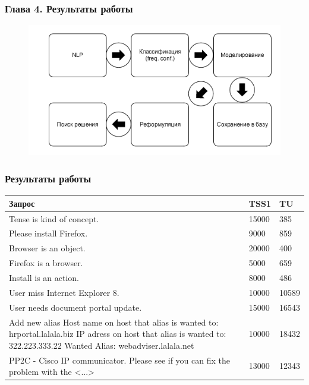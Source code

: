 \documentclass[14pt]{beamer}
\begin{document}
\begin{frame}
\frametitle{Глава 4. Результаты работы}
\begin{figure} [h] 
  \center
  \includegraphics [scale=0.6] {workflow}
  \caption{} 
  \label{img:workflow}  
\end{figure}
\end{frame}

\begin{frame}
\frametitle{Результаты работы}
\begin{table}
	
\small
\begin{tabular} {|p{8cm}|p{1cm}|p{1cm}|}

\hline
\textbf{Запрос} & TSS1 & TU \\
\hline
  Tense is kind of concept. & 15000 & 385 \\
  
  \hline
  Please install Firefox.  & 9000 & 859 \\
  \hline
  Browser is an object.   & 20000 & 400 \\
  \hline
  Firefox is a browser.   & 5000 & 659  \\
  \hline
  Install is an action.    & 8000 & 486 \\
  \hline
  User miss Internet Explorer 8.     & 10000 & 10589 \\
  \hline
  User needs document portal update.    & 15000 & 16543 \\
  \hline
  Add new alias Host name on host that alias is wanted to: hrportal.lalala.biz IP adress on host that alias is wanted to: 322.223.333.22 Wanted Alias:    webadviser.lalala.net    & 10000 & 18432  \\ 
  \hline
  PP2C - Cisco IP communicator. Please see if you can fix the problem with the <...> & 13000 & 12343 \\ 
   \hline
   \end{tabular}
\end{table}
\end{frame}
\end{document}
